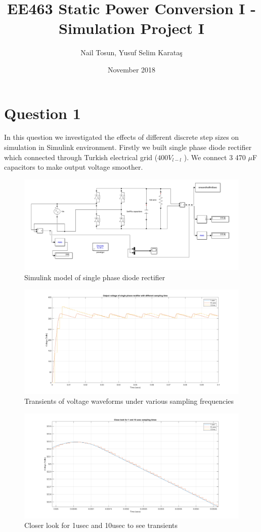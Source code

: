 \documentclass[fleqn, a4paper]{article}
\title{EE463 Static Power Conversion I 
-Simulation Project I}
\author{Nail Tosun, Yusuf Selim Karataş}
\date{November 2018}
\begin{document}
\maketitle

\section*{Question 1}
In this question we investigated the effects of different discrete step sizes on simulation in Simulink environment. Firstly we built single phase diode rectifier which connected through Turkish electrical grid ($400 V_{l-l}$ ). We connect 3 470 $\mu$F capacitors to make output voltage smoother. 
\begin{figure}[H]
  \includegraphics[width=\linewidth]{question-1-simulink-model.PNG}
  \caption{Simulink model of single phase diode rectifier}
  \label{fig:simulink2}
\end{figure}
\begin{figure}[H]
  \includegraphics[width=\linewidth]{Q1_plots_different_samplings.png}
  \caption{Transients of voltage waveforms under various sampling frequencies}
  \label{fig:simulink2}
\end{figure}
\begin{figure}[H]
  \includegraphics[width=\linewidth]{closer-look.png}
  \caption{Closer look for 1usec and 10usec to see transients}
  \label{fig:simulink2}
\end{figure}
\end{document}
